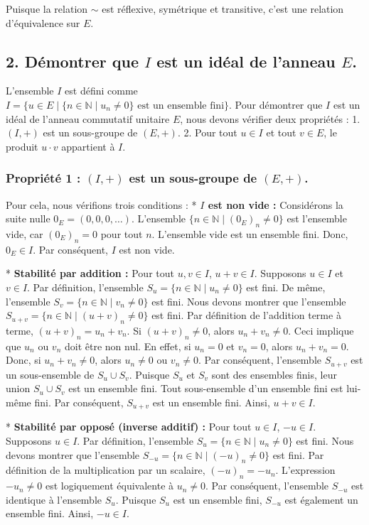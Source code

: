 \documentclass{report}
\begin{document}
Puisque la relation $\sim$ est réflexive, symétrique et transitive, c'est une relation d'équivalence sur $E$.

\subsection*{2. Démontrer que $I$ est un idéal de l'anneau $E$.}

L'ensemble $I$ est défini comme $I = \{ u \in E \mid \{ n \in \mathbb{N} \mid u_n \neq 0 \} \text{ est un ensemble fini} \}$.
Pour démontrer que $I$ est un idéal de l'anneau commutatif unitaire $E$, nous devons vérifier deux propriétés :
1.  $(I, +)$ est un sous-groupe de $(E, +)$.
2.  Pour tout $u \in I$ et tout $v \in E$, le produit $u \cdot v$ appartient à $I$.

\subsubsection*{Propriété 1 : $(I, +)$ est un sous-groupe de $(E, +)$.}
Pour cela, nous vérifions trois conditions :
*   \textbf{$I$ est non vide :}
    Considérons la suite nulle $0_E = (0, 0, 0, \dots)$.
    L'ensemble $\{ n \in \mathbb{N} \mid (0_E)_n \neq 0 \}$ est l'ensemble vide, car $(0_E)_n = 0$ pour tout $n$.
    L'ensemble vide est un ensemble fini.
    Donc, $0_E \in I$. Par conséquent, $I$ est non vide.

*   \textbf{Stabilité par addition :} Pour tout $u, v \in I$, $u+v \in I$.
    Supposons $u \in I$ et $v \in I$.
    Par définition, l'ensemble $S_u = \{ n \in \mathbb{N} \mid u_n \neq 0 \}$ est fini.
    De même, l'ensemble $S_v = \{ n \in \mathbb{N} \mid v_n \neq 0 \}$ est fini.
    Nous devons montrer que l'ensemble $S_{u+v} = \{ n \in \mathbb{N} \mid (u+v)_n \neq 0 \}$ est fini.
    Par définition de l'addition terme à terme, $(u+v)_n = u_n + v_n$.
    Si $(u+v)_n \neq 0$, alors $u_n + v_n \neq 0$.
    Ceci implique que $u_n$ ou $v_n$ doit être non nul. En effet, si $u_n=0$ et $v_n=0$, alors $u_n+v_n=0$.
    Donc, si $u_n+v_n \neq 0$, alors $u_n \neq 0$ ou $v_n \neq 0$.
    Par conséquent, l'ensemble $S_{u+v}$ est un sous-ensemble de $S_u \cup S_v$.
    Puisque $S_u$ et $S_v$ sont des ensembles finis, leur union $S_u \cup S_v$ est un ensemble fini.
    Tout sous-ensemble d'un ensemble fini est lui-même fini.
    Par conséquent, $S_{u+v}$ est un ensemble fini.
    Ainsi, $u+v \in I$.

*   \textbf{Stabilité par opposé (inverse additif) :} Pour tout $u \in I$, $-u \in I$.
    Supposons $u \in I$.
    Par définition, l'ensemble $S_u = \{ n \in \mathbb{N} \mid u_n \neq 0 \}$ est fini.
    Nous devons montrer que l'ensemble $S_{-u} = \{ n \in \mathbb{N} \mid (-u)_n \neq 0 \}$ est fini.
    Par définition de la multiplication par un scalaire, $(-u)_n = -u_n$.
    L'expression $-u_n \neq 0$ est logiquement équivalente à $u_n \neq 0$.
    Par conséquent, l'ensemble $S_{-u}$ est identique à l'ensemble $S_u$.
    Puisque $S_u$ est un ensemble fini, $S_{-u}$ est également un ensemble fini.
    Ainsi, $-u \in I$.
\end{document}
